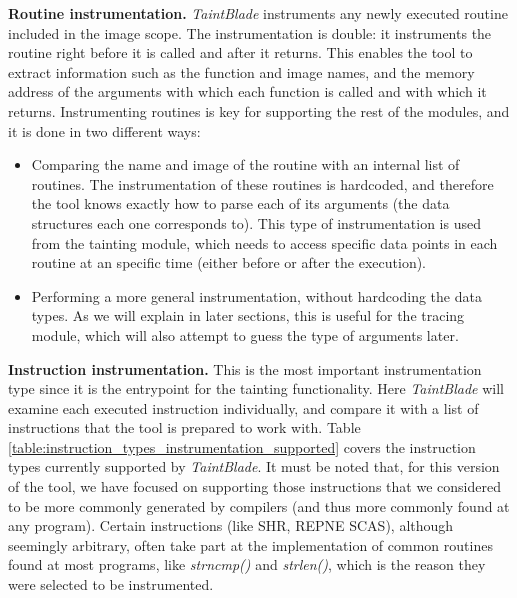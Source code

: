 \documentclass[conference]{IEEEtran}
\begin{document}
\textbf{Routine instrumentation.}
\textit{TaintBlade} instruments any newly executed routine included in the image scope. The instrumentation is double: it instruments
the routine right before it is called and after it returns. This enables
the tool to extract information such as the function and image names, and the memory address of the arguments with which each
function is called and with which it returns. Instrumenting routines is key for supporting the rest of the modules, and it is done in two different ways:

\begin{itemize}
    \item Comparing the name and image of the routine with an internal list of routines.
          The instrumentation of these routines is hardcoded, and therefore the tool
          knows exactly how to parse each of its arguments (the data structures each one
          corresponds to). This type of instrumentation is used from the tainting module,
          which needs to access specific data points in each routine at an specific time
          (either before or after the execution).
    \item Performing a more general instrumentation, without hardcoding the data types.
          As we will explain in later sections, this is useful for the tracing module,
          which will also attempt to guess the type of arguments later.
\end{itemize}

\textbf{Instruction instrumentation.}
This is the most important instrumentation type since it is the entrypoint for the tainting functionality.
Here \textit{TaintBlade} will examine each executed instruction individually, and
compare it with a list of instructions that the tool is prepared to work with. Table \ref{table:instruction_types_instrumentation_supported}
covers the instruction types currently supported by \textit{TaintBlade}. It must be noted that, for this version of the tool, we have focused
on supporting those instructions that we considered to be more commonly generated by compilers (and thus
more commonly found at any program). Certain instructions (like SHR, REPNE SCAS), although seemingly arbitrary,
often take part at the implementation of common routines found at most programs, like \textit{strncmp()} and \textit{strlen()},
which is the reason they were selected to be instrumented.
\end{document}
